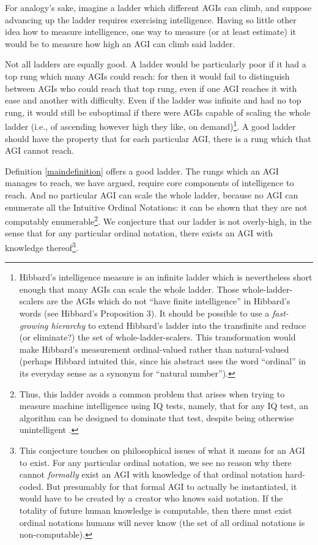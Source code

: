 \documentclass[runningheads]{llncs}
\begin{document}
For analogy's sake, imagine a ladder which different AGIs
can climb, and suppose advancing up the ladder requires exercising
intelligence. Having so little other idea how to measure
intelligence, one way to measure (or at least estimate) it would be
to measure how high an AGI can climb said ladder.

Not all ladders are equally good. A ladder would be particularly poor if it had
a top rung which many AGIs could reach: for then it would fail to
distinguish between AGIs who could reach that top rung, even if one
AGI reaches it with ease and another with difficulty.
Even if the ladder was infinite and had no top rung, it would still be suboptimal
if there were AGIs capable of scaling the whole
ladder (i.e., of ascending however high they like, on demand)\footnote{Hibbard's
intelligence measure
\cite{hibbard2011measuring} is an infinite ladder
which is nevertheless short enough that many AGIs can
scale the whole ladder. Those whole-ladder-scalers are the AGIs which
do not ``have finite intelligence'' in Hibbard's words
(see Hibbard's Proposition 3). It should be possible to
use a \emph{fast-growing hierarchy}
\cite{fairtlough1998hierarchies} \cite{weiermann2002slow}
to extend Hibbard's ladder into the transfinite and reduce (or eliminate?)
the set of whole-ladder-scalers. This transformation would make
Hibbard's measurement ordinal-valued rather than natural-valued
(perhaps Hibbard intuited this, since his abstract uses the
word ``ordinal''
in its everyday sense as a synonym for ``natural number'').}.
A good ladder
should have the property that for each particular AGI, there is a rung which
that AGI cannot reach.

Definition \ref{maindefinition} offers a good ladder.
The rungs which an AGI
manages to reach, we have argued, require core components of intelligence
to reach.
And no particular AGI can scale
the whole ladder,
because no AGI can enumerate all the Intuitive Ordinal Notations: it can
be shown
that they are not computably enumerable\footnote{Thus,
this ladder avoids a common problem that arises when
trying to measure machine intelligence using IQ tests, namely, that for any IQ test,
an algorithm can be designed to dominate that
test, despite being otherwise unintelligent \cite{besold2015can}.}.
We conjecture that our ladder is not overly-high, in the sense that for any
particular ordinal notation, there exists an AGI with knowledge
thereof\footnote{This conjecture touches on philosophical issues of what it
means for an AGI to exist. For any particular ordinal notation, we see no reason
why there cannot \emph{formally} exist an AGI with knowledge of that ordinal notation
hard-coded. But presumably for that formal AGI to actually be instantiated,
it would have to be created by a creator who knows said notation. If the totality
of future human knowledge is computable,
then there must exist ordinal notations humans will never know
(the set of all ordinal notations is non-computable).}.
\end{document}
